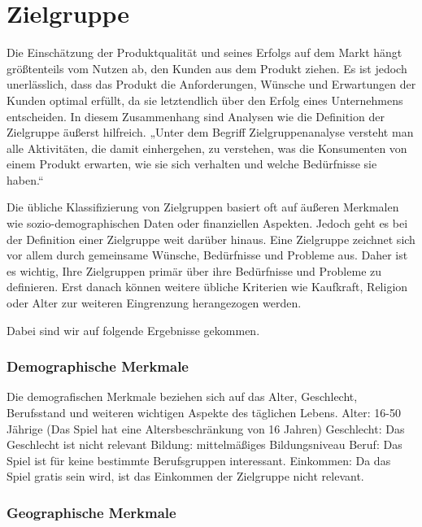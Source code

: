 \usepackage{hyperref}
\section{Zielgruppe}\label{sec:zielgruppe}

\renewcommand{\kapitelautor}{Autor: Nils} %

%
Die Einschätzung der Produktqualität und seines Erfolgs auf dem Markt hängt größtenteils vom Nutzen ab, den Kunden aus dem Produkt ziehen.
Es ist jedoch unerlässlich, dass das Produkt die Anforderungen, Wünsche und Erwartungen der Kunden optimal erfüllt, da sie letztendlich über den Erfolg eines Unternehmens entscheiden.
In diesem Zusammenhang sind Analysen wie die Definition der Zielgruppe äußerst hilfreich.
„Unter dem Begriff Zielgruppenanalyse versteht man alle Aktivitäten, die damit einhergehen, zu verstehen, was die Konsumenten von einem
Produkt erwarten, wie sie sich verhalten und welche Bedürfnisse sie haben.“


Die übliche Klassifizierung von Zielgruppen basiert oft auf äußeren Merkmalen wie sozio-demographischen Daten oder finanziellen Aspekten.
Jedoch geht es bei der Definition einer Zielgruppe weit darüber hinaus. Eine Zielgruppe zeichnet sich vor allem durch gemeinsame Wünsche,
Bedürfnisse und Probleme aus. Daher ist es wichtig, Ihre Zielgruppen primär über ihre Bedürfnisse und Probleme zu definieren.
Erst danach können weitere übliche Kriterien wie Kaufkraft, Religion oder Alter zur weiteren Eingrenzung herangezogen werden. \cite[vgl.]{Zielgruppedef}

Dabei sind wir auf folgende Ergebnisse gekommen.

\subsubsection{Demographische Merkmale}\label{subsubsec:Demographische-Merkmale}

Die demografischen Merkmale beziehen sich auf das Alter, Geschlecht, Berufsstand und weiteren wichtigen Aspekte des täglichen Lebens.\cite[vgl.]{DemographischeMerkmale}
Alter: 16-50 Jährige (Das Spiel hat eine Altersbeschränkung von 16 Jahren)
Geschlecht: Das Geschlecht ist nicht relevant
Bildung: mittelmäßiges Bildungsniveau
Beruf: Das Spiel ist für keine bestimmte Berufsgruppen interessant.
Einkommen: Da das Spiel gratis sein wird, ist das Einkommen der Zielgruppe nicht
relevant.

\subsubsection{Geographische Merkmale}\label{subsubsec:Geographische-Merkmale}

